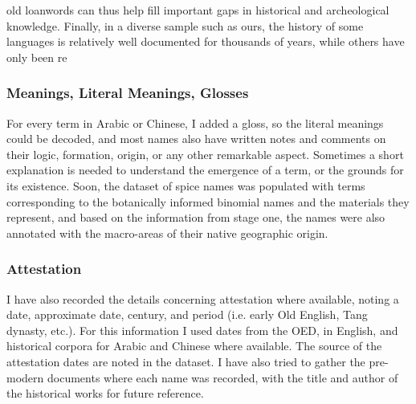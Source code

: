 old loanwords can thus help fill important gaps in historical and archeological knowledge. Finally, in a diverse sample such as ours, the history of some languages is relatively well documented for thousands of years, while others have only been re




\subsubsection{Meanings, Literal Meanings, Glosses}

For every term in Arabic or Chinese, I added a gloss, so the literal meanings could be decoded, and most names also have written notes and comments on their logic, formation, origin, or any other remarkable aspect. Sometimes a short explanation is needed to understand the emergence of a term, or the grounds for its existence. Soon, the dataset of spice names was populated with terms corresponding to the botanically informed binomial names and the materials they represent, and based on the information from stage one, the names were also annotated with the macro-areas of their native geographic origin.


\subsubsection{Attestation}

I have also recorded the details concerning attestation where available, noting a date, approximate date, century, and period (i.e. early Old English, Tang dynasty, etc.). For this information I used dates from the \gls{OED}, in English, and historical corpora for Arabic and Chinese where available. The source of the attestation dates are noted in the dataset. I have also tried to gather the pre-modern documents where each name was recorded, with the title and author of the historical works for future reference. %


